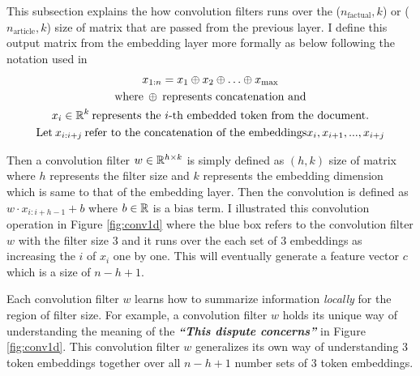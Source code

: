 \documentclass[12pt,letterpaper]{article}
\begin{document}
This subsection explains the how convolution filters runs over the ($n_{\text{factual}}, k$) or ($n_{\text{article}}, k$) size of matrix that are passed from the previous layer.
I define this output matrix from the embedding layer more formally as below following the notation used in \cite{textcnn}
\begin{gather}
 \nonumber x_{1:n} = x_1 \oplus x_2 \oplus \ldots \oplus x_{\text{max}}\\
 \nonumber \text{where\:} \oplus \: \text{represents concatenation and} \\
 \nonumber x_i \in \Bbb R^k \: \text{represents the $i$-th embedded token from the document.}\\
 \nonumber \text{Let} \: x_{i:i+j} \: \text{refer to the concatenation of the embeddings} x_i, x_{i+1}, . . . , x_{i+j}
\end{gather}
 
 
\noindent Then a convolution filter $w \in \Bbb R^{h \times k}$ is simply defined as $(h, k)$ size of matrix where $h$ represents the filter size and $k$ represents the embedding dimension which is same to that of the embedding layer.
Then the convolution is defined as $w \cdot x_{i:i+h-1} + b$ where $b \in \Bbb R$ is a bias term.
I illustrated this convolution operation in Figure \ref{fig:conv1d} where the blue box refers to the convolution filter $w$ with the filter size 3 and it runs over the
each set of 3 embeddings as increasing the $i$ of $x_i$ one by one. This will eventually generate a feature vector $c$ which is a size of $n-h+1$.
 
Each convolution filter $w$ learns how to summarize information \textit{locally} for the region of filter size. For example, a convolution filter $w$ holds its unique way of
understanding the meaning of the \textit{\textbf{``This dispute concerns''}} in Figure \ref{fig:conv1d}.
This convolution filter $w$ generalizes its own way of understanding 3 token embeddings together over all $n-h+1$ number sets of 3 token embeddings.
 
\end{document}
